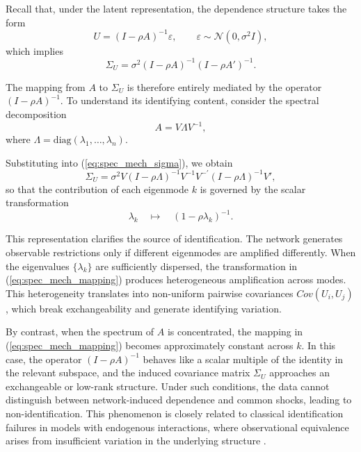 \documentclass[12pt]{article}
\numberwithin{equation}{section}
\begin{document}
Recall that, under the latent representation, the dependence structure takes the form
\begin{equation}
U = (I - \rho A)^{-1} \varepsilon,
\qquad
\varepsilon \sim \mathcal{N}(0, \sigma^2 I),
\label{eq:spec_mech_u}
\end{equation}
which implies
\begin{equation}
\Sigma_U
=
\sigma^2 (I - \rho A)^{-1}(I - \rho A')^{-1}.
\label{eq:spec_mech_sigma}
\end{equation}

The mapping from $A$ to $\Sigma_U$ is therefore entirely mediated by the operator $(I - \rho A)^{-1}$. To understand its identifying content, consider the spectral decomposition
\begin{equation}
A = V \Lambda V^{-1},
\label{eq:spec_mech_A}
\end{equation}
where $\Lambda = \mathrm{diag}(\lambda_1,\ldots,\lambda_n)$.

Substituting into (\ref{eq:spec_mech_sigma}), we obtain
\begin{equation}
\Sigma_U
=
\sigma^2
V (I - \rho \Lambda)^{-1}
V^{-1}
V^{-\prime} (I - \rho \Lambda)^{-1}
V',
\label{eq:spec_mech_sigma2}
\end{equation}
so that the contribution of each eigenmode $k$ is governed by the scalar transformation
\begin{equation}
\lambda_k
\quad \mapsto \quad
(1 - \rho \lambda_k)^{-1}.
\label{eq:spec_mech_mapping}
\end{equation}

This representation clarifies the source of identification. The network generates observable restrictions only if different eigenmodes are amplified differently. When the eigenvalues $\{\lambda_k\}$ are sufficiently dispersed, the transformation in (\ref{eq:spec_mech_mapping}) produces heterogeneous amplification across modes. This heterogeneity translates into non-uniform pairwise covariances $Cov(U_i,U_j)$, which break exchangeability and generate identifying variation.

By contrast, when the spectrum of $A$ is concentrated, the mapping in (\ref{eq:spec_mech_mapping}) becomes approximately constant across $k$. In this case, the operator $(I - \rho A)^{-1}$ behaves like a scalar multiple of the identity in the relevant subspace, and the induced covariance matrix $\Sigma_U$ approaches an exchangeable or low-rank structure. Under such conditions, the data cannot distinguish between network-induced dependence and common shocks, leading to non-identification. This phenomenon is closely related to classical identification failures in models with endogenous interactions, where observational equivalence arises from insufficient variation in the underlying structure \citep{manski1993identification}.
\end{document}
